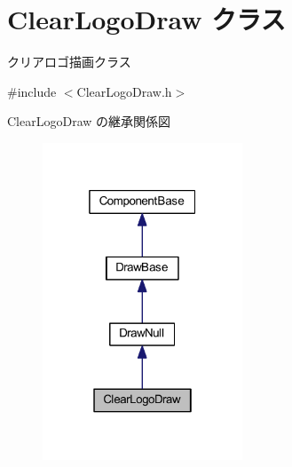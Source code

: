 \hypertarget{class_clear_logo_draw}{}\section{Clear\+Logo\+Draw クラス}
\label{class_clear_logo_draw}


クリアロゴ描画クラス  




{\ttfamily \#include $<$Clear\+Logo\+Draw.\+h$>$}



Clear\+Logo\+Draw の継承関係図\nopagebreak
\begin{figure}[H]
\begin{center}
\leavevmode
\includegraphics[width=169pt]{class_clear_logo_draw__inherit__graph}
\end{center}
\end{figure}
